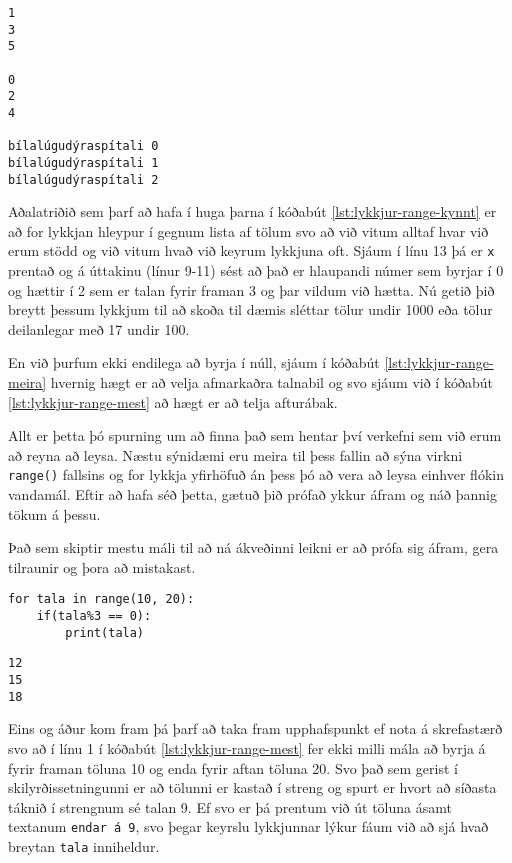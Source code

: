 \lstset{style=uttak}
\begin{lstlisting}
1
3
5

0
2
4

bílalúgudýraspítali 0
bílalúgudýraspítali 1
bílalúgudýraspítali 2
\end{lstlisting}

Aðalatriðið sem þarf að hafa í huga þarna í kóðabút \ref{lst:lykkjur-range-kynnt} er að for lykkjan hleypur í gegnum lista af tölum svo að við vitum alltaf hvar við erum stödd og við vitum hvað við keyrum lykkjuna oft.
Sjáum í línu 13 þá er \texttt{x} prentað og á úttakinu (línur 9-11) sést að það er hlaupandi númer sem byrjar í 0 og hættir í 2 sem er talan fyrir framan 3 og þar vildum við hætta.
Nú getið þið breytt þessum lykkjum til að skoða til dæmis sléttar tölur undir 1000 eða tölur deilanlegar með 17 undir 100.

En við þurfum ekki endilega að byrja í núll, sjáum í kóðabút \ref{lst:lykkjur-range-meira} hvernig hægt er að velja afmarkaðra talnabil og svo sjáum við í kóðabút \ref{lst:lykkjur-range-mest} að hægt er að telja afturábak.

Allt er þetta þó spurning um að finna það sem hentar því verkefni sem við erum að reyna að leysa.
Næstu sýnidæmi eru meira til þess fallin að sýna virkni \texttt{range()} fallsins og for lykkja yfirhöfuð án þess þó að vera að leysa einhver flókin vandamál.
Eftir að hafa séð þetta, gætuð þið prófað ykkur áfram og náð þannig tökum á þessu.

Það sem skiptir mestu máli til að ná ákveðinni leikni er að prófa sig áfram, gera tilraunir og þora að mistakast.

\lstset{style=venjulegt}
\begin{lstlisting}[caption=for lykkja og range() fallið með skilyrðissetningu, label=lst:lykkjur-range-meira]
for tala in range(10, 20):
	if(tala%3 == 0):
		print(tala)
\end{lstlisting}

\lstset{style=uttak}
\begin{lstlisting}
12
15
18
\end{lstlisting}

Eins og áður kom fram þá þarf að taka fram upphafspunkt ef nota á skrefastærð svo að í línu 1 í kóðabút \ref{lst:lykkjur-range-mest} fer ekki milli mála að byrja á fyrir framan töluna 10 og enda fyrir aftan töluna 20.
Svo það sem gerist í skilyrðissetningunni er að tölunni er kastað í streng og spurt er hvort að síðasta táknið í strengnum sé talan 9.
Ef svo er þá prentum við út töluna ásamt textanum \texttt{endar á 9}, svo þegar keyrslu lykkjunnar lýkur fáum við að sjá hvað breytan \texttt{tala} inniheldur.


